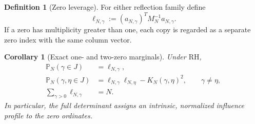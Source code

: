 \documentclass[11pt]{amsart}
\numberwithin{equation}{section}
\theoremstyle{plain}
\newtheorem{corollary}[theorem]{Corollary}
\theoremstyle{definition}
\newtheorem{definition}[theorem]{Definition}
\theoremstyle{remark}
\newcommand{\RH}{\mathrm{RH}}
\begin{document}
\begin{definition}[Zero leverage]
\label{def:zero_leverage}
For either reflection family define
\begin{equation}
\ell_{N,\gamma}:=(a_{N,\gamma})^TM_N^{-1}a_{N,\gamma}.
\label{eq:zero_leverage}
\end{equation}
If a zero has multiplicity greater than one, each copy is regarded as a separate zero index with the same column vector.
\end{definition}

\begin{corollary}[Exact one- and two-zero marginals]
\label{cor:zero_marginals}
Under $\RH$,
\begin{align}
\mathbb P_N(\gamma\in J)&=\ell_{N,\gamma},
\label{eq:one_zero_marginal}\\
\mathbb P_N(\gamma,\eta\in J)
&=\ell_{N,\gamma}\ell_{N,\eta}-K_N(\gamma,\eta)^2,
\qquad \gamma\ne\eta,
\label{eq:two_zero_marginal}\\
\sum_{\gamma>0}\ell_{N,\gamma}&=N.
\label{eq:total_leverage_N}
\end{align}
In particular, the full determinant assigns an intrinsic, normalized influence profile to the zero ordinates.
\end{corollary}
\end{document}
